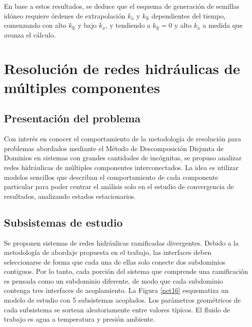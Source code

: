 En base a estos resultados, se deduce que el esquema de generación de semillas idóneo
requiere órdenes de extrapolación $k_{\bar{x}}$ y $k_{\mathbb{B}}$ dependientes del tiempo,
comenzando con alto $k_{\mathbb{B}}$ y bajo $k_{\bar{x}}$, y tendiendo a $k_{\mathbb{B}}=0$ y alto $k_{\bar{x}}$ a medida que avanza el cálculo.

\section{Resolución de redes hidráulicas de múltiples componentes}
\label{3:redes}

\subsection*{Presentación del problema}
\label{3:redes-presentacion}

Con interés en conocer el comportamiento de la metodología de resolución
para problemas abordados mediante el Método de Descomposición Disjunta de Dominios en sistemas con grandes cantidades de incógnitas,
se propuso analizar redes hidráulicas de múltiples componentes interconectados.
La idea es utilizar modelos sencillos que describan el comportamiento de cada componente particular para poder centrar el análisis solo en el estudio de convergencia
de resultados, analizando estados estacionarios.

\subsection*{Subsistemas de estudio}
\label{3:redes-subsistemas}

Se proponen sistemas de redes hidráulicas ramificadas divergentes.
Debido a la metodología de abordaje propuesta en el trabajo, las interfaces deben seleccionarse de forma que cada una de ellas solo conecte dos subdominios contiguos.
Por lo tanto, cada porción del sistema que comprende una ramificación es pensada como un subdominio diferente,
de modo que cada subdominio contenga tres interfaces de acoplamiento.
La Figura \ref{net16} esquematiza un modelo de estudio con 5 subsistemas acoplados.
Los parámetros geométricos de cada subsistema se sortean aleatoriamente entre valores típicos.
El fluido de trabajo es agua a temperatura y presión ambiente.

